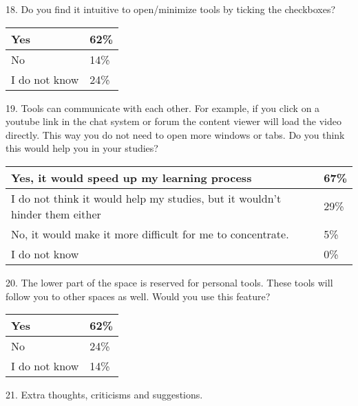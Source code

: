 18. Do you find it intuitive to open/minimize tools by ticking the checkboxes?

\begin{center}
    \begin{tabular}{ | l | l | }
    \hline
    Yes & 62\% \\ \hline
	No & 14\% \\ \hline
	I do not know & 24\% \\ \hline
    \end{tabular}
\end{center}

19. Tools can communicate with each other. For example, if you click on a youtube link in the chat system or forum the content viewer will load the video directly. This way you do not need to open more windows or tabs. Do you think this would help you in your studies?

\begin{center}
    \begin{tabular}{ | l | l | }
    \hline
    Yes, it would speed up my learning process & 67\% \\ \hline
	I do not think it would help my studies, but it wouldn't hinder them either & 29\% \\ \hline
	No, it would make it more difficult for me to concentrate. & 5\% \\ \hline
	I do not know & 0\% \\ \hline
    \end{tabular}
\end{center}

20. The lower part of the space is reserved for personal tools. These tools will follow you to other spaces as well. Would you use this feature?

\begin{center}
    \begin{tabular}{ | l | l | }
    \hline
    Yes & 62\% \\ \hline
	No & 24\% \\ \hline
	I do not know & 14\% \\ \hline
    \end{tabular}
\end{center}

21. Extra thoughts, criticisms and suggestions.


